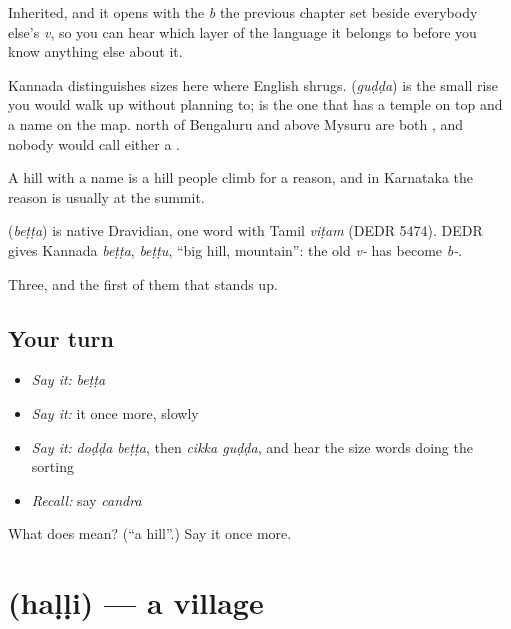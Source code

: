 Inherited, and it opens with the \emph{b} the previous chapter set beside everybody else's \emph{v}, so you can hear which layer of the language it belongs to before you know anything else about it.

Kannada distinguishes sizes here where English shrugs.  (\emph{guḍḍa}) is the small rise you would walk up without planning to;  is the one that has a temple on top and a name on the map.   north of Bengaluru and   above Mysuru are both , and nobody would call either a .

A hill with a name is a hill people climb for a reason, and in Karnataka the reason is usually at the summit.

\begin{cousinweb}
\textbf{} (\emph{beṭṭa}) is native Dravidian, one word with Tamil \emph{viṭam} (DEDR 5474). DEDR gives Kannada \emph{beṭṭa}, \emph{beṭṭu}, \textquotedblleft{}big hill, mountain\textquotedblright{}: the old \emph{v-} has become \emph{b-}.
\end{cousinweb}

\begin{grammarlens}[title={What you've built}]
Three, and the first of them that stands up.
\end{grammarlens}

\subsection*{Your turn}
\begin{itemize}
\raggedright
  \item \emph{Say it:} \emph{beṭṭa}
  \item \emph{Say it:} it once more, slowly
  \item \emph{Say it:} \emph{doḍḍa beṭṭa}, then \emph{cikka guḍḍa}, and hear the size words doing the sorting
  \item \emph{Recall:} say \emph{candra}
\end{itemize}

\begin{tcolorbox}[breakable,colback=teal!4,colframe=teal!35!black,title={Before you move on}]
What does  mean? (\textquotedblleft{}a hill\textquotedblright{}.) Say it once more.
\end{tcolorbox}
\section[\texorpdfstring{\kn{ಹಳ್ಳಿ} (haḷḷi)}{ಹಳ್ಳಿ (haḷḷi)}]{ (haḷḷi) — a village}

